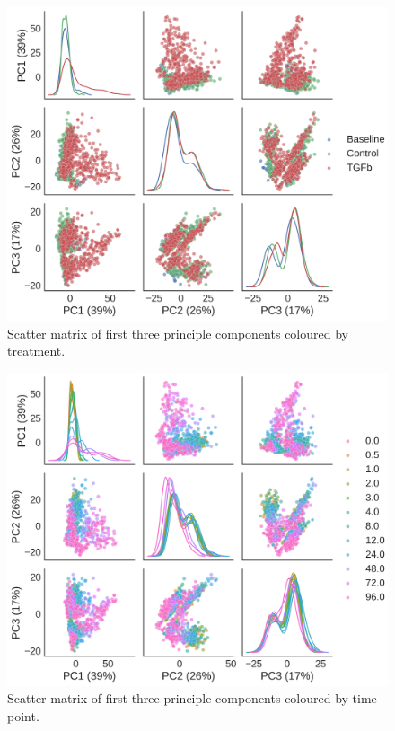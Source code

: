 \documentclass[alpha-refs]{wiley-article}
\begin{document}
\begin{figure}
	\centering
	\includegraphics[height=0.5\textheight]{img/qc/treatment}
	\caption{Scatter matrix of first three principle components coloured by treatment.}
	\label{fig:qc:treatment}
\end{figure}

\begin{figure}
	\centering
	\includegraphics[height=0.5\textheight]{img/qc/time_point}
	\caption{Scatter matrix of first three principle components coloured by time point.}
	\label{fig:qc:time_point}
\end{figure}
\end{document}
